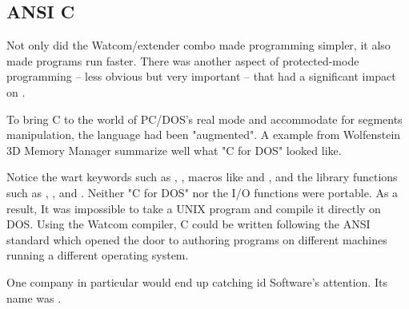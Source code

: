 \subsection{ANSI C}
Not only did the Watcom/extender combo made programming simpler, it also made programs run faster. There was another aspect of protected-mode programming -- less obvious but very important -- that had a significant impact on \doom.\\
\par
To bring C to the world of PC/DOS's real mode and accommodate for segments manipulation, the language had been "augmented". A example from Wolfenstein 3D Memory Manager summarize well what "C for DOS" looked like.\\
\par
{}
\par
Notice the wart keywords such as , , macros like  and , and the  library functions such as , , and . Neither "C for DOS" nor the I/O functions were portable. As a result, It was impossible to take a UNIX program and compile it directly on DOS. Using the Watcom compiler, C could be written following the ANSI standard which opened the door to authoring programs on different machines running a different operating system.\\
\par
 One company in particular would end up catching id Software's attention. Its name was \NeXTns.
